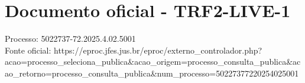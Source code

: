 \documentclass[12pt]{article}
\begin{document}
\section*{Documento oficial - TRF2-LIVE-1}
Processo: 5022737-72.2025.4.02.5001\\
Fonte oficial: https://eproc.jfes.jus.br/eproc/externo\_controlador.php?acao=processo\_seleciona\_publica\&acao\_origem=processo\_consulta\_publica\&acao\_retorno=processo\_consulta\_publica\&num\_processo=50227377220254025001\\
\end{document}
